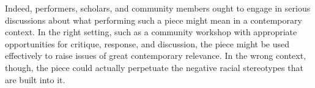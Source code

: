 Indeed, performers, scholars, and community members ought to engage in serious
discussions about what performing such a piece might mean in a contemporary
context.  
In the right setting, such as a community workshop with appropriate
opportunities for critique, response, and discussion, the piece might be used 
effectively to raise issues of great contemporary relevance.
In the wrong context, though, the piece could actually perpetuate the negative
racial stereotypes that are built into it.



